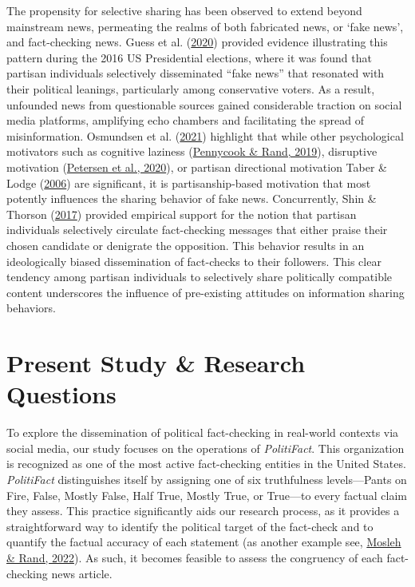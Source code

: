 \documentclass[
  12pt,
]{article}
\begin{document}
The propensity for selective sharing has been observed to extend beyond
mainstream news, permeating the realms of both fabricated news, or `fake
news', and fact-checking news. Guess et al.
(\protect\hyperlink{ref-guess2020exposure}{2020}) provided evidence
illustrating this pattern during the 2016 US Presidential elections,
where it was found that partisan individuals selectively disseminated
``fake news'' that resonated with their political leanings, particularly
among conservative voters. As a result, unfounded news from questionable
sources gained considerable traction on social media platforms,
amplifying echo chambers and facilitating the spread of misinformation.
Osmundsen et al. (\protect\hyperlink{ref-osmundsen2021partisan}{2021})
highlight that while other psychological motivators such as cognitive
laziness (\protect\hyperlink{ref-pennycook2019lazy}{Pennycook \& Rand,
2019}), disruptive motivation
(\protect\hyperlink{ref-petersen2020need}{Petersen et al., 2020}), or
partisan directional motivation Taber \& Lodge
(\protect\hyperlink{ref-taber2006motivated}{2006}) are significant, it
is partisanship-based motivation that most potently influences the
sharing behavior of fake news. Concurrently, Shin \& Thorson
(\protect\hyperlink{ref-shin2017partisan}{2017}) provided empirical
support for the notion that partisan individuals selectively circulate
fact-checking messages that either praise their chosen candidate or
denigrate the opposition. This behavior results in an ideologically
biased dissemination of fact-checks to their followers. This clear
tendency among partisan individuals to selectively share politically
compatible content underscores the influence of pre-existing attitudes
on information sharing behaviors.

\hypertarget{present-study-research-questions}{%
\section{Present Study \& Research
Questions}\label{present-study-research-questions}}

To explore the dissemination of political fact-checking in real-world
contexts via social media, our study focuses on the operations of
\emph{PolitiFact}. This organization is recognized as one of the most
active fact-checking entities in the United States. \emph{PolitiFact}
distinguishes itself by assigning one of six truthfulness levels---Pants
on Fire, False, Mostly False, Half True, Mostly True, or True---to every
factual claim they assess. This practice significantly aids our research
process, as it provides a straightforward way to identify the political
target of the fact-check and to quantify the factual accuracy of each
statement (as another example see,
\protect\hyperlink{ref-mosleh2022measuring}{Mosleh \& Rand, 2022}). As
such, it becomes feasible to assess the congruency of each fact-checking
news article.
\end{document}
